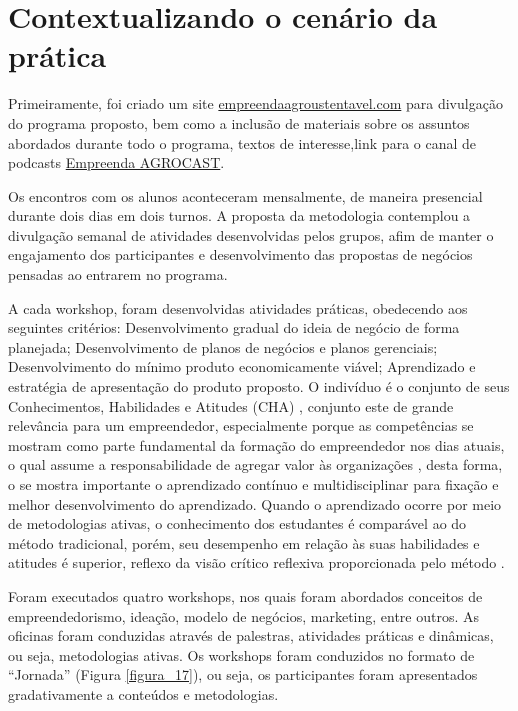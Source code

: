 \section{Contextualizando o cenário da prática}

Primeiramente, foi criado um site \href{http://www.empreendaagrosustentavel.com}{empreendaagroustentavel.com} para divulgação do programa proposto, bem como a inclusão de materiais sobre os assuntos abordados durante todo o programa, textos de interesse,link para o canal de podcasts \href{https://open.spotify.com/show/3c25hRSxvaCFPw6Y3lX3i1?si=9H_fGz_uRgGiFNhAcdr4rQ}{Empreenda AGROCAST}.





Os encontros com os alunos aconteceram mensalmente, de maneira presencial durante dois dias em dois turnos. A proposta da metodologia contemplou a divulgação semanal de atividades desenvolvidas pelos grupos, afim de manter o engajamento dos participantes e desenvolvimento das propostas de negócios pensadas ao entrarem no programa. 

A cada workshop, foram desenvolvidas atividades práticas, obedecendo aos seguintes critérios: 
Desenvolvimento gradual do ideia de negócio de forma planejada; Desenvolvimento de planos de negócios e planos gerenciais; Desenvolvimento do mínimo produto economicamente viável; Aprendizado e estratégia de apresentação do produto proposto. O indivíduo é o conjunto de seus Conhecimentos, Habilidades e Atitudes (CHA) \cite{dutra_competencias:_2004}, conjunto este de grande relevância para um empreendedor, especialmente porque as competências se mostram como parte fundamental da formação do empreendedor nos dias atuais, o qual assume a responsabilidade de agregar valor às organizações \cite{ferreira_conhecimento_2019}, desta forma, o se mostra importante o aprendizado contínuo e multidisciplinar para fixação e melhor desenvolvimento do aprendizado. Quando o aprendizado ocorre por meio de metodologias ativas, o conhecimento dos estudantes é comparável ao do método tradicional, porém, seu desempenho em relação às suas habilidades e atitudes é superior, reflexo da visão crítico reflexiva proporcionada pelo método \cite{limberger_metodologias_2013}.

Foram executados quatro workshops, nos quais foram abordados conceitos de empreendedorismo, ideação, modelo de negócios, marketing, entre outros. As oficinas foram conduzidas através de palestras, atividades práticas e dinâmicas, ou seja, metodologias ativas. Os workshops foram conduzidos no formato de “Jornada” (Figura \ref{figura_17}), ou seja, os participantes foram apresentados gradativamente a conteúdos e metodologias. 







